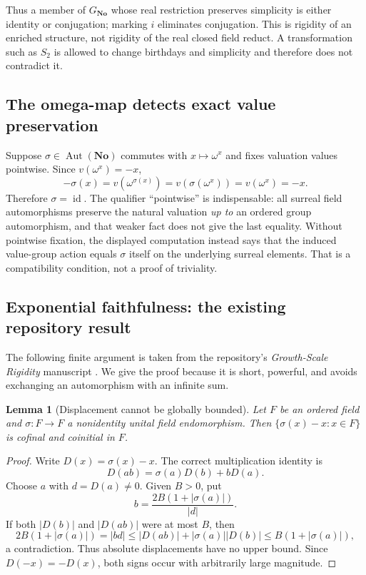 \documentclass[11pt]{article}
\newtheorem{lemma}[theorem]{Lemma}
\theoremstyle{definition}
\theoremstyle{remark}
\newcommand{\No}{\mathbf{No}}
\newcommand{\id}{\operatorname{id}}
\newcommand{\Aut}{\operatorname{Aut}}
\numberwithin{equation}{section}
\begin{document}
Thus a member of $G_{\No}$ whose real restriction preserves simplicity is
either identity or conjugation; marking $i$ eliminates conjugation. This
is rigidity of an enriched structure, not rigidity of the real closed
field reduct. A transformation such as $S_2$ is allowed to change birthdays
and simplicity and therefore does not contradict it.

\subsection{The omega-map detects exact value preservation}

Suppose $\sigma\in\Aut(\No)$ commutes with $x\mapsto\omega^x$ and fixes
valuation values pointwise. Since $v(\omega^x)=-x$,
\[
 -\sigma(x)=v(\omega^{\sigma(x)})
 =v(\sigma(\omega^x))=v(\omega^x)=-x.
\]
Therefore $\sigma=\id$. The qualifier ``pointwise'' is indispensable:
all surreal field automorphisms preserve the natural valuation \emph{up to}
an ordered group automorphism, and that weaker fact does not give the last
equality. Without pointwise fixation, the displayed computation instead
says that the induced value-group action equals $\sigma$ itself on the
underlying surreal elements. That is a compatibility condition, not a
proof of triviality.

\subsection{Exponential faithfulness: the existing repository result}

The following finite argument is taken from the repository's
\emph{Growth-Scale Rigidity} manuscript \cite{RepoRigidity}. We give the
proof because it is short, powerful, and avoids exchanging an automorphism
with an infinite sum.

\begin{lemma}[Displacement cannot be globally bounded]\label{saut:lem:displacement}
Let $F$ be an ordered field and $\sigma:F\to F$ a nonidentity unital field
endomorphism. Then $\{\sigma(x)-x:x\in F\}$ is cofinal and coinitial in $F$.
\end{lemma}
\begin{proof}
Write $D(x)=\sigma(x)-x$. The correct multiplication identity is
\begin{equation}\label{saut:eq:displacement}
 D(ab)=\sigma(a)D(b)+bD(a).
\end{equation}
Choose $a$ with $d=D(a)\ne0$. Given $B>0$, put
\[
 b=\frac{2B(1+|\sigma(a)|)}{|d|}.
\]
If both $|D(b)|$ and $|D(ab)|$ were at most $B$, then
\[
 2B(1+|\sigma(a)|)=|bd|
 \le |D(ab)|+|\sigma(a)||D(b)|
 \le B(1+|\sigma(a)|),
\]
a contradiction. Thus absolute displacements have no upper bound.
Since $D(-x)=-D(x)$, both signs occur with arbitrarily large magnitude.
\end{proof}
\end{document}
